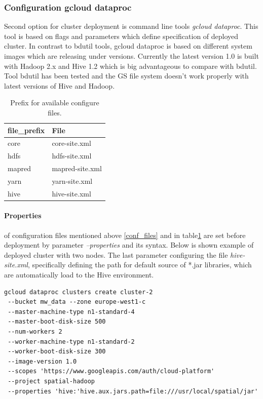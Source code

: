 \documentclass[a4paper,12pt,oneside]{report}
\begin{document}
\subsubsection{Configuration gcloud dataproc}
Second option for cluster deployment is command line tools \textit{gcloud dataproc}. This tool is based on flags and parameters which define specification of deployed cluster. In contrast to bdutil tools, gcloud dataproc is based on different system images which are releasing under versions. Currently the latest version 1.0 is built with Hadoop 2.x and Hive 1.2 which is big advantageous to compare with bdutil. Tool bdutil has been tested and the GS file system doesn’t work properly with latest versions of Hive and Hadoop. 
\begin{table}[!htbp]
\centering
\begin{scriptsize}
\begin{tabular}{@{}|l|l|@{}}
\toprule 
file\_prefix & File            \\ \midrule \midrule
core         & core-site.xml   \\ \midrule
hdfs         & hdfs-site.xml   \\ \midrule
mapred       & mapred-site.xml \\ \midrule
yarn         & yarn-site.xml   \\ \midrule
hive         & hive-site.xml   \\ \bottomrule
\end{tabular}
\end{scriptsize}
\caption{Prefix for available configure files.}
\label{config_table}
\end{table}
\paragraph{Properties} of configuration files mentioned above \ref{conf_files} and in table\ref{config_table} are set before deployment by parameter \textit{--properties} and its syntax. Below is shown example of deployed cluster with two nodes. The last parameter configuring the file \textit{hive-site.xml},  specifically defining the path for default source of *.jar libraries, which are automatically load to the Hive environment. \cite{gcloud_dataproc}
\begin{footnotesize}
\begin{lstlisting}[style=python]
gcloud dataproc clusters create cluster-2 
 --bucket mw_data --zone europe-west1-c
 --master-machine-type n1-standard-4 
 --master-boot-disk-size 500 
 --num-workers 2
 --worker-machine-type n1-standard-2 
 --worker-boot-disk-size 300 
 --image-version 1.0 
 --scopes 'https://www.googleapis.com/auth/cloud-platform' 
 --project spatial-hadoop
 --properties 'hive:'hive.aux.jars.path=file:///usr/local/spatial/jar'
\end{lstlisting}
\end{footnotesize}
\end{document}
